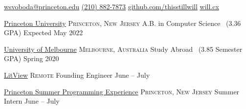 \documentclass[10pt,letterpaper]{article}
\begin{document}
\sloppy


\nobreakvspace{0.3em}

\noindent\href{mailto:wsvoboda.at.princeton.dot.edu}{wsvoboda\mbox{}@\mbox{}princeton.edu}\sbull
\href{tel:2108827873}{(210) 882-7873}\sbull
\href{https://github.com/thisstillwill}{github.com/thisstillwill}\sbull
\href{https://will.cx}{will.cx}

\spacedhrule{0.9em}{-0.4em}


\headedsection
  {\href{https://www.princeton.edu/}{Princeton University}}
  {\textsc{Princeton, New Jersey}} {%
  \headedsubsection
    {A.B. in Computer Science \textnormal{~(3.36 GPA)}}
    {Expected May 2022}
    {}
}

\headedsection
  {\href{https://www.unimelb.edu.au/}{University of Melbourne}}
  {\textsc{Melbourne, Australia}} {%
  \headedsubsection
    {Study Abroad \textnormal{~(3.85 Semester GPA)}}
    {Spring 2020} {}
}

\spacedhrule{0.5em}{-0.4em}


\headedsection
  {\href{https://www.litview.co/}{LitView}}
  {\textsc{Remote}} {%
  \headedsubsection
    {Founding Engineer}
    {June  -- July }
    {}
}

\headedsection
  {\href{https://www.cs.princeton.edu/academics/ugradpgm/spe/home/}{Princeton Summer Programming Experience}}
  {\textsc{Princeton, New Jersey}} {%
  \headedsubsection
    {Summer Intern}
    {June  -- July }
    {}
}
\end{document}
